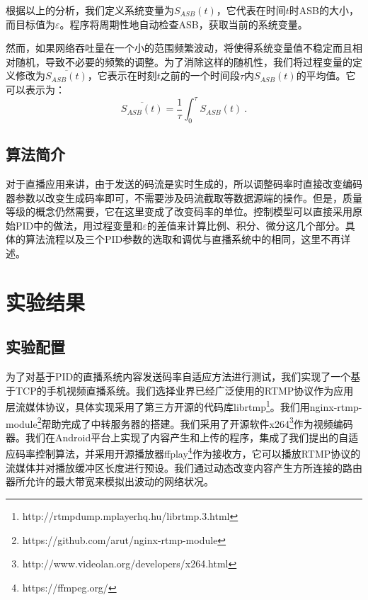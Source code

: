 根据以上的分析，我们定义系统变量为$S_{ASB}(t)$，它代表在时间$t$时ASB的大小，而目标值为$\varepsilon$。程序将周期性地自动检查ASB，获取当前的系统变量。

然而，如果网络吞吐量在一个小的范围频繁波动，将使得系统变量值不稳定而且相对随机，导致不必要的频繁的调整。为了消除这样的随机性，我们将过程变量的定义修改为$\overline{S_{ASB}(t)}$，它表示在时刻$t$之前的一个时间段$\tau$内$S_{ASB}(t)$的平均值。它可以表示为：
\begin{equation}
\label{eq:asb}
\overline{S_{ASB}(t)} = \dfrac{1}{\tau} \int_0^\tau {S_{ASB}(t)}\: .
\end{equation}

\subsection{算法简介}

对于直播应用来讲，由于发送的码流是实时生成的，所以调整码率时直接改变编码器参数以改变生成码率即可，不需要涉及码流截取等数据源端的操作。但是，质量等级的概念仍然需要，它在这里变成了改变码率的单位。控制模型可以直接采用原始PID中的做法，用过程变量和$\varepsilon$的差值来计算比例、积分、微分这几个部分。具体的算法流程以及三个PID参数的选取和调优与直播系统中的相同，这里不再详述。

\section{实验结果}

\subsection{实验配置}

为了对基于PID的直播系统内容发送码率自适应方法进行测试，我们实现了一个基于TCP的手机视频直播系统。我们选择业界已经广泛使用的RTMP协议作为应用层流媒体协议，具体实现采用了第三方开源的代码库librtmp\footnote{http://rtmpdump.mplayerhq.hu/librtmp.3.html}。我们用nginx-rtmp-module\footnote{https://github.com/arut/nginx-rtmp-module}帮助完成了中转服务器的搭建。我们采用了开源软件x264\footnote{http://www.videolan.org/developers/x264.html}作为视频编码器。我们在Android平台上实现了内容产生和上传的程序，集成了我们提出的自适应码率控制算法，并采用开源播放器ffplay\footnote{https://ffmpeg.org/}作为接收方，它可以播放RTMP协议的流媒体并对播放缓冲区长度进行预设。我们通过动态改变内容产生方所连接的路由器所允许的最大带宽来模拟出波动的网络状况。

